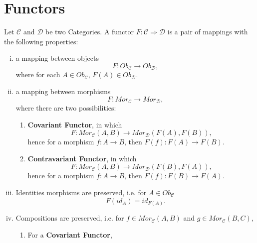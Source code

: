 \section{Functors}

\begin{definition}[Functor]
  Let $\mathcal C$ and $\mathcal D$ be two Categories. A functor $F: \mathcal C \Rightarrow \mathcal D$ is
  a pair of mappings with the following properties:
  \begin{enumerate}[(i)]
    \item a mapping between objects
      \begin{displaymath}
        F:Ob_\mathcal C \to Ob_\mathcal D,
      \end{displaymath}
      where for each $A \in Ob_\mathcal C$, $F(A) \in Ob_\mathcal D$.
    \item a mapping between morphisms
      \begin{displaymath}
        F:Mor_\mathcal C \to Mor_\mathcal D,
      \end{displaymath}
      where there are two possibilities:
      \begin{enumerate}
        \item \textbf{Covariant Functor}, in which
          \begin{displaymath}
            F:Mor_\mathcal C(A,B) \to Mor_\mathcal D (F(A),F(B)),
          \end{displaymath}
          hence for a morphism $f:A \to B$, then $F(f):F(A) \to F(B)$.
        \item \textbf{Contravariant Functor}, in which
          \begin{displaymath}
            F:Mor_\mathcal C(A,B) \to Mor_\mathcal D (F(B),F(A)),
          \end{displaymath}
          hence for a morphism $f:A \to B$, then $F(f):F(B) \to F(A)$.
      \end{enumerate}
    \item Identities morphisms are preserved, i.e. for $A \in Ob_\mathcal C$
        \begin{displaymath}
          F(id_A) =  id_{F(A)}.
        \end{displaymath}
    \item Compositions are preserved, i.e. for $f \in Mor_\mathcal C(A,B)$
      and $ g \in Mor_\mathcal C(B,C)$,
      \begin{enumerate}
        \item For a \textbf{Covariant Functor},
          \begin{displaymath}

\end{displaymath}
\end{enumerate}
\end{enumerate}
\end{definition}
